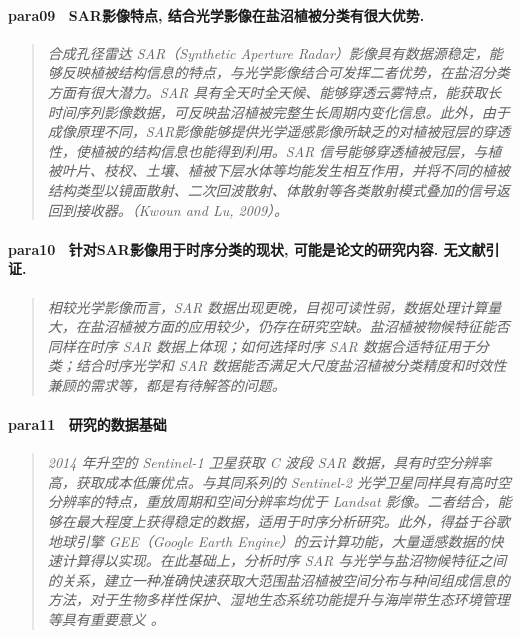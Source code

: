 \paragraph*{para09~
    \textcolor[RGB]{17, 205, 29}{SAR影像特点, 结合光学影像在盐沼植被分类有很大优势.}}
\begin{quotation}
    \itshape
    合成孔径雷达 SAR（Synthetic Aperture Radar）影像具有数据源稳定，能够反映植被结构信息的特点，与光学影像结合可发挥二者优势，在盐沼分类方面有很大潜力。SAR 具有全天时全天候、能够穿透云雾特点，能获取长时间序列影像数据，可反映盐沼植被完整生长周期内变化信息。此外，由于成像原理不同，SAR影像能够提供光学遥感影像所缺乏的对植被冠层的穿透性，使植被的结构信息也能得到利用。SAR 信号能够穿透植被冠层，与植被叶片、枝杈、土壤、植被下层水体等均能发生相互作用，并将不同的植被结构类型以镜面散射、二次回波散射、体散射等各类散射模式叠加的信号返回到接收器。（Kwoun and Lu, 2009）。
\end{quotation}

\paragraph*{para10~
    \textcolor[RGB]{17, 205, 29}{针对SAR影像用于时序分类的现状, 可能是论文的研究内容. 无文献引证.}}
\begin{quotation}
    \itshape
    相较光学影像而言，SAR 数据出现更晚，目视可读性弱，数据处理计算量大，在盐沼植被方面的应用较少，仍存在研究空缺。盐沼植被物候特征能否同样在时序 SAR 数据上体现；如何选择时序 SAR 数据合适特征用于分类；结合时序光学和 SAR 数据能否满足大尺度盐沼植被分类精度和时效性兼顾的需求等，都是有待解答的问题。 
\end{quotation}

\paragraph*{para11~
    \textcolor[RGB]{17, 205, 29}{研究的数据基础}}
\begin{quotation}
    \itshape
    2014 年升空的 Sentinel-1 卫星获取 C 波段  SAR 数据，具有时空分辨率高，获取成本低廉优点。与其同系列的 Sentinel-2 光学卫星同样具有高时空分辨率的特点，重放周期和空间分辨率均优于 Landsat 影像。二者结合，能够在最大程度上获得稳定的数据，适用于时序分析研究。此外，得益于谷歌地球引擎 GEE（Google Earth Engine）的云计算功能，大量遥感数据的快速计算得以实现。在此基础上，分析时序 SAR 与光学与盐沼物候特征之间的关系，建立一种准确快速获取大范围盐沼植被空间分布与种间组成信息的方法，对于生物多样性保护、湿地生态系统功能提升与海岸带生态环境管理等具有重要意义  。 
    
\end{quotation}

